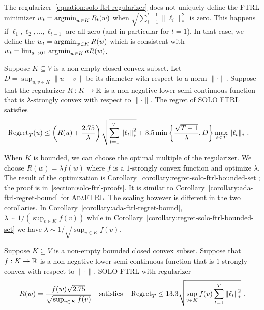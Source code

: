 The regularizer~\eqref{equation:solo-ftrl-regularizer} does not uniquely define
the \textsc{FTRL} minimizer $w_t = \operatorname*{argmin}_{w \in K} R_t(w)$ when
$\sqrt{\sum_{i=1}^{t-1} \|\ell_i\|_*^2}$ is zero. This happens if $\ell_1,
\ell_2, \dots, \ell_{t-1}$ are all zero (and in particular for $t=1$).  In that
case, we define the $w_t = \operatorname*{argmin}_{w \in K} R(w)$ which is consistent with
$w_t = \lim_{a \to 0^+}  \operatorname*{argmin}_{w \in K} a R(w)$.

\begin{theorem}
\label{theorem:regret-solo-ftrl}
Suppose $K \subseteq V$ is a non-empty closed convex subset.  Let $D =
\sup_{u,v \in K} \|u - v\|$ be its diameter with respect to a norm $\|\cdot\|$.
Suppose that the regularizer $R:K \to \mathbb{R}$ is a non-negative lower
semi-continuous function that is $\lambda$-strongly convex with respect to
$\|\cdot\|$. The regret of \textsc{SOLO FTRL} satisfies
\begin{align*}
\operatorname{Regret}_T(u)
& \le \left( R(u) + \frac{2.75}{\lambda}\right) \sqrt{\sum_{t=1}^{T} {\left\|{\ell_t}\right\|}_*^2}
+ 3.5 \min\left\{\frac{\sqrt{T-1}}{\lambda} , D\right\} \max_{t \le T} \|\ell_t\|_* \; .
\end{align*}
\end{theorem}

When $K$ is bounded, we can choose the optimal multiple of the regularizer.  We
choose $R(w) = \lambda f(w)$ where $f$ is a $1$-strongly convex function and
optimize $\lambda$.  The result of the optimization is
Corollary~\ref{corollary:regret-solo-ftrl-bounded-set}; the proof is
in~\ref{section:solo-ftrl-proofs}.  It is similar to
Corollary~\ref{corollary:ada-ftrl-regret-bound} for \textsc{AdaFTRL}. The
scaling however is different in the two corollaries.  In
Corollary~\ref{corollary:ada-ftrl-regret-bound}, $\lambda \sim 1/(\sup_{v \in
K} f(v))$ while in Corollary~\ref{corollary:regret-solo-ftrl-bounded-set} we
have $\lambda \sim 1/\sqrt{\sup_{v \in K} f(v)}$.

\begin{corollary}
\label{corollary:regret-solo-ftrl-bounded-set}
Suppose $K \subseteq V$ is a non-empty bounded closed convex subset.  Suppose
that $f:K \to \mathbb{R}$ is a non-negative lower semi-continuous function that is
$1$-strongly convex with respect to $\|\cdot\|$. \textsc{SOLO FTRL} with
regularizer
$$
R(w) = \frac{f(w)\sqrt{2.75}}{\sqrt{\sup_{v \in K} f(v)}}
\quad \text{satisfies} \quad
\operatorname{Regret}_T \le 13.3 \sqrt{\sup_{v \in K} f(v) \sum_{t=1}^{T} {\left\|{\ell_t}\right\|}_*^2} \; .
$$
\end{corollary}

